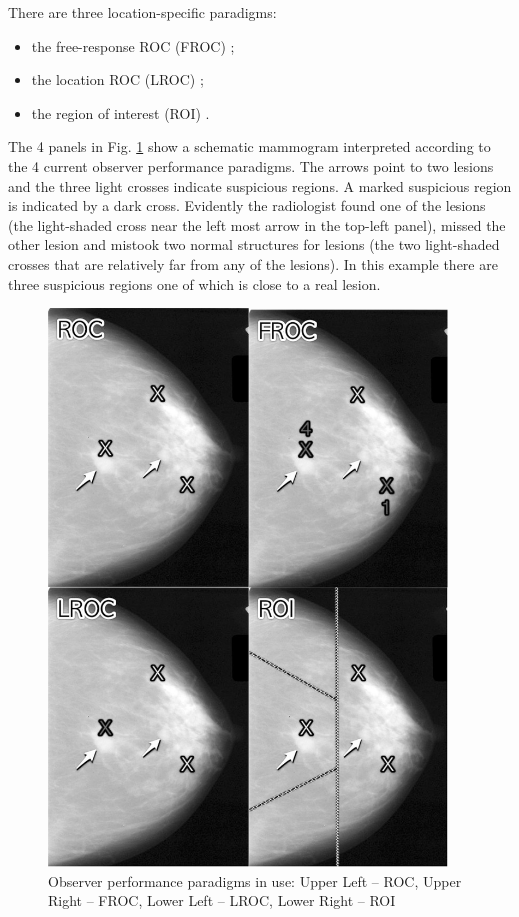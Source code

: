 \documentclass[
]{book}
\providecommand{\tightlist}{%
  \setlength{\itemsep}{0pt}\setlength{\parskip}{0pt}}
\begin{document}
There are three location-specific paradigms:

\begin{itemize}
\tightlist
\item
  the free-response ROC (FROC) \citep{bunch1977free, chakraborty1989maximum};
\item
  the location ROC (LROC) \citep{starr1977comments, swensson1996unified};
\item
  the region of interest (ROI) \citep{obuchowski2010data}.
\end{itemize}

The 4 panels in Fig. \ref{fig:froc-paradigm-4} show a schematic mammogram interpreted according to the 4 current observer performance paradigms. The arrows point to two lesions and the three light crosses indicate suspicious regions. A marked suspicious region is indicated by a dark cross. Evidently the radiologist found one of the lesions (the light-shaded cross near the left most arrow in the top-left panel), missed the other lesion and mistook two normal structures for lesions (the two light-shaded crosses that are relatively far from any of the lesions). In this example there are three suspicious regions one of which is close to a real lesion.

\begin{figure}

{\centering \includegraphics[width=300pt]{images/4Paradigms} 

}

\caption{Observer performance paradigms in use: Upper Left -- ROC, Upper Right -- FROC, Lower Left -- LROC, Lower Right -- ROI}\label{fig:froc-paradigm-4}
\end{figure}
\end{document}
